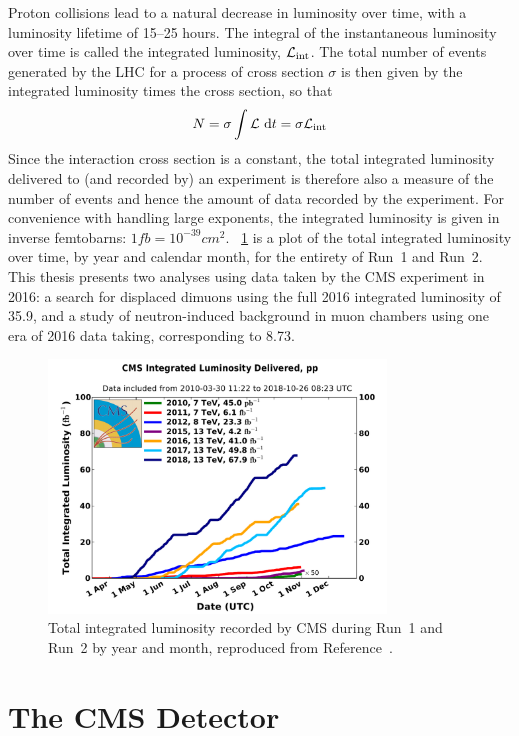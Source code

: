 Proton collisions lead to a natural decrease in luminosity over time, with a luminosity lifetime of 15--25 hours.
The integral of the instantaneous luminosity over time is called the integrated luminosity, $\mathcal{L}_\mathrm{int}$.
The total number of events generated by the LHC for a process of cross section $\sigma$ is then given by the integrated luminosity times the cross section, so that
\begin{align}
  N = \sigma \int{\lumi\,\dd t} = \sigma \intlumi
  \label{cms:intlumi}
\end{align}
Since the \pp interaction cross section is a constant, the total integrated luminosity delivered to (and recorded by) an experiment is therefore also a measure of the number of events and hence the amount of data recorded by the experiment.
For convenience with handling large exponents, the integrated luminosity is given in inverse femtobarns: $1\unit{fb} = 10^{-39}\unit{cm}^2$.
\Fig~\ref{cms:totallumi} is a plot of the total \pp integrated luminosity over time, by year and calendar month, for the entirety of Run~1 and Run~2.
This thesis presents two analyses using data taken by the CMS experiment in 2016: a search for displaced dimuons using the full 2016 integrated luminosity of 35.9\fbinv, and a study of neutron-induced background in muon chambers using one era of 2016 data taking, corresponding to 8.73\fbinv.

\begin{figure}[tpb]
  \centering
  \includegraphics[width=0.8\textwidth]{figures/cms/CMSIntLumi.pdf}
  \caption{Total \pp integrated luminosity recorded by CMS during Run~1 and Run~2 by year and month, reproduced from Reference~\cite{LumiTwiki}.}
  \label{cms:totallumi}
\end{figure}

\section{The CMS Detector}
